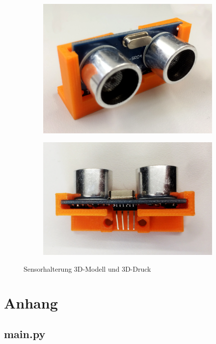 \documentclass[a4paper, 12pt]{scrartcl}
\begin{document}
\begin{figure}[ht!]
\begin{subfigure}{.5\textwidth}
		\includegraphics[width=\textwidth]{../bilder_videos/Sensorhalterung.png}
	\end{subfigure}%
	\begin{subfigure}{.5\textwidth} \centering
		\includegraphics[width=\textwidth]{../bilder_videos/Sensorhalterung_Top.png}
	\end{subfigure}%
	\caption{Sensorhalterung 3D-Modell und 3D-Druck}
\end{figure}

\newpage
\section{Anhang}

\subsection{main.py}

\end{document}
